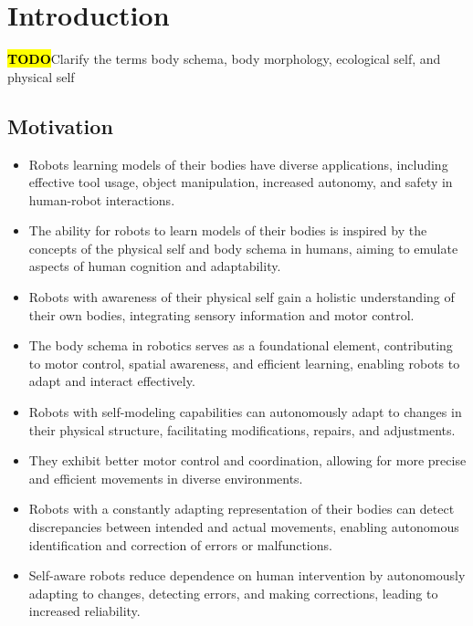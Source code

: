 \documentclass[12pt, a4paper]{article}
\newcommand{\TODO}{\hl{\textbf{TODO}}}
\begin{document}
\section*{Introduction}
\TODO Clarify the terms body schema, body morphology, ecological self, and physical self
\subsection*{Motivation}
\begin{itemize}
	\item Robots learning models of their bodies have diverse applications, including effective tool usage, object manipulation, increased autonomy, and safety in human-robot interactions.

	\item The ability for robots to learn models of their bodies is inspired by the concepts of the physical self and body schema in humans, aiming to emulate aspects of human cognition and adaptability.

	\item Robots with awareness of their physical self gain a holistic understanding of their own bodies, integrating sensory information and motor control.

	\item The body schema in robotics serves as a foundational element, contributing to motor control, spatial awareness, and efficient learning, enabling robots to adapt and interact effectively.

	\item Robots with self-modeling capabilities can autonomously adapt to changes in their physical structure, facilitating modifications, repairs, and adjustments.

	\item They exhibit better motor control and coordination, allowing for more precise and efficient movements in diverse environments.

	\item Robots with a constantly adapting representation of their bodies can detect discrepancies between intended and actual movements, enabling autonomous identification and correction of errors or malfunctions.

	\item Self-aware robots reduce dependence on human intervention by autonomously adapting to changes, detecting errors, and making corrections, leading to increased reliability.

\end{itemize}
\end{document}
